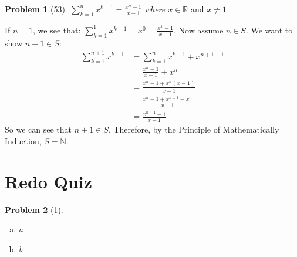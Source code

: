 \documentclass{article}
\theoremstyle{problem}
\newtheorem{prob}{Problem}
\theoremstyle{plain}
\begin{document}
\begin{prob}[53]
$\displaystyle \sum_{k = 1}^{n}{x^{k-1}}  = \frac{x^n - 1}{x - 1}$ where $x \in \mathbb{R}\text{ and }x \not = 1$
\end{prob}
If $n = 1$, we see that: $\sum_{k = 1}^{1}{x^{k-1}}  = x^0 = \frac{x^1 - 1}{x - 1}$. Now assume $n \in S$. We want to show $n+1 \in S$:
\begin{align*}
\displaystyle \sum_{k = 1}^{n+1}{x^{k-1}}  &= \displaystyle \sum_{k = 1}^{n}{x^{k-1}} + x^{n+1-1}\\
&= \frac{x^n - 1}{x-1} + x^n\\
&= \frac{x^n - 1 + x^n(x - 1)}{x - 1}\\
&= \frac{x^n - 1 + x^{n+1} - x^n}{x - 1}\\
&= \frac{x^{n+1} - 1}{x - 1}
\end{align*}
So we can see that $n + 1 \in S$. Therefore, by the Principle of Mathematically Induction, $S = \mathbb{N}$.

\section*{Redo Quiz}
\begin{prob}[1]\ \\[-1cm]
  \begin{enumerate}[a)]
  \item a
  \item b
  \end{enumerate}
\end{prob}
\end{document}
